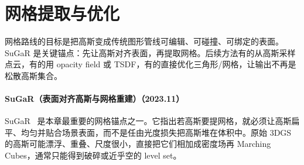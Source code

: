 \section{网格提取与优化}

网格路线的目标是把高斯变成传统图形管线可编辑、可碰撞、可绑定的表面。SuGaR 是关键锚点：先让高斯对齐表面，再提取网格。后续方法有的从高斯采样点云，有的用 opacity field 或 TSDF，有的直接优化三角形/网格，让输出不再是松散高斯集合。
\paragraph{SuGaR（表面对齐高斯与网格重建）（2023.11）}
SuGaR~\cite{2311_12775} 是本章最重要的网格锚点之一。它指出若高斯要提网格，就必须让高斯扁平、均匀并贴合场景表面，而不是任由光度损失把高斯堆在体积中。原始 3DGS 的高斯可能漂浮、重叠、尺度很小，直接把它们相加成密度场再 Marching Cubes，通常只能得到破碎或近乎空的 level set。


